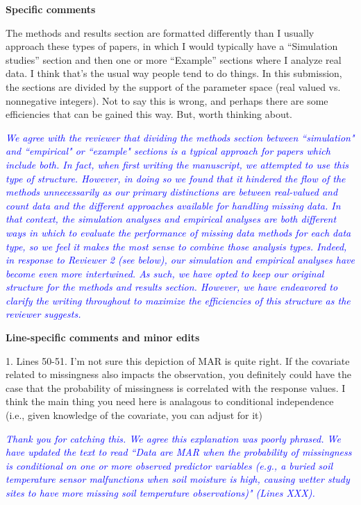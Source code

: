 \documentclass{article}
\begin{document}
\begin{linenumbers}
\bigskip

\noindent \textbf{Specific comments}

The methods and results section are formatted differently than I usually approach these types of papers, in which I would typically have a ``Simulation studies” section and then one or more ``Example” sections where I analyze real data. I think that’s the usual way people tend to do things. In this submission, the sections are divided by the support of the parameter space (real valued vs. nonnegative integers). Not to say this is wrong, and perhaps there are some efficiencies that can be gained this way. But, worth thinking about.

\noindent \textcolor{blue}{\textit{We agree with the reviewer that dividing the methods section between ``simulation" and ``empirical" or ``example" sections is a typical approach for papers which include both. In fact, when first writing the manuscript, we attempted to use this type of structure. However, in doing so we found that it hindered the flow of the methods unnecessarily as our primary distinctions are between real-valued and count data and the different approaches available for handling missing data. In that context, the simulation analyses and empirical analyses are both different ways in which to evaluate the performance of missing data methods for each data type, so we feel it makes the most sense to combine those analysis types. Indeed, in response to Reviewer 2 (see below), our simulation and empirical analyses have become even more intertwined. As such, we have opted to keep our original structure for the methods and results section. However, we have endeavored to clarify the writing throughout to maximize the efficiencies of this structure as the reviewer suggests.}} 

\bigskip

\noindent \textbf{Line-specific comments and minor edits}

1. Lines 50-51. I’m not sure this depiction of MAR is quite right. If the covariate related to missingness also impacts the observation, you definitely could have the case that the probability of missingness is correlated with the response values. I think the main thing you need here is analagous to conditional independence (i.e., given knowledge of the covariate, you can adjust for it)

\noindent \textcolor{blue}{\textit{Thank you for catching this. We agree this explanation was poorly phrased. We have updated the text to read ``Data are MAR when the probability of missingness is conditional on one or more observed predictor variables (e.g., a buried soil temperature sensor malfunctions when soil moisture is high, causing wetter study sites to have more missing soil temperature observations)" (Lines XXX).}}  


\end{linenumbers}
\end{document}
